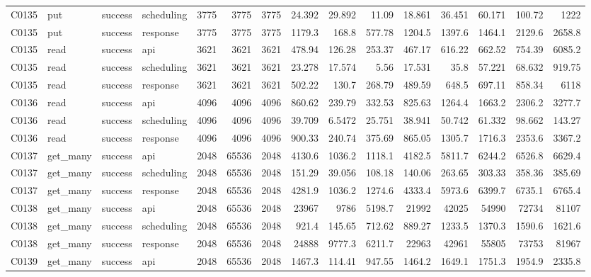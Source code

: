 \begin{landscape}
\begin{longtable}{llllrrrrrrrrrrr}
C0135 & put & success & scheduling & 3775 & 3775 & 3775 & 24.392 & 29.892 & 11.09 & 18.861 & 36.451 & 60.171 & 100.72 & 1222\\
C0135 & put & success & response & 3775 & 3775 & 3775 & 1179.3 & 168.8 & 577.78 & 1204.5 & 1397.6 & 1464.1 & 2129.6 & 2658.8\\
C0135 & read & success & api & 3621 & 3621 & 3621 & 478.94 & 126.28 & 253.37 & 467.17 & 616.22 & 662.52 & 754.39 & 6085.2\\
C0135 & read & success & scheduling & 3621 & 3621 & 3621 & 23.278 & 17.574 & 5.56 & 17.531 & 35.8 & 57.221 & 68.632 & 919.75\\
C0135 & read & success & response & 3621 & 3621 & 3621 & 502.22 & 130.7 & 268.79 & 489.59 & 648.5 & 697.11 & 858.34 & 6118\\
C0136 & read & success & api & 4096 & 4096 & 4096 & 860.62 & 239.79 & 332.53 & 825.63 & 1264.4 & 1663.2 & 2306.2 & 3277.7\\
C0136 & read & success & scheduling & 4096 & 4096 & 4096 & 39.709 & 6.5472 & 25.751 & 38.941 & 50.742 & 61.332 & 98.662 & 143.27\\
C0136 & read & success & response & 4096 & 4096 & 4096 & 900.33 & 240.74 & 375.69 & 865.05 & 1305.7 & 1716.3 & 2353.6 & 3367.2\\
C0137 & get\_\allowbreak{}many & success & api & 2048 & 65536 & 2048 & 4130.6 & 1036.2 & 1118.1 & 4182.5 & 5811.7 & 6244.2 & 6526.8 & 6629.4\\
C0137 & get\_\allowbreak{}many & success & scheduling & 2048 & 65536 & 2048 & 151.29 & 39.056 & 108.18 & 140.06 & 263.65 & 303.33 & 358.36 & 385.69\\
C0137 & get\_\allowbreak{}many & success & response & 2048 & 65536 & 2048 & 4281.9 & 1036.2 & 1274.6 & 4333.4 & 5973.6 & 6399.7 & 6735.1 & 6765.4\\
C0138 & get\_\allowbreak{}many & success & api & 2048 & 65536 & 2048 & 23967 & 9786 & 5198.7 & 21992 & 42025 & 54990 & 72734 & 81107\\
C0138 & get\_\allowbreak{}many & success & scheduling & 2048 & 65536 & 2048 & 921.4 & 145.65 & 712.62 & 889.27 & 1233.5 & 1370.3 & 1590.6 & 1621.6\\
C0138 & get\_\allowbreak{}many & success & response & 2048 & 65536 & 2048 & 24888 & 9777.3 & 6211.7 & 22963 & 42961 & 55805 & 73753 & 81967\\
C0139 & get\_\allowbreak{}many & success & api & 2048 & 65536 & 2048 & 1467.3 & 114.41 & 947.55 & 1464.2 & 1649.1 & 1751.3 & 1954.9 & 2335.8\\

\end{longtable}
\end{landscape}
